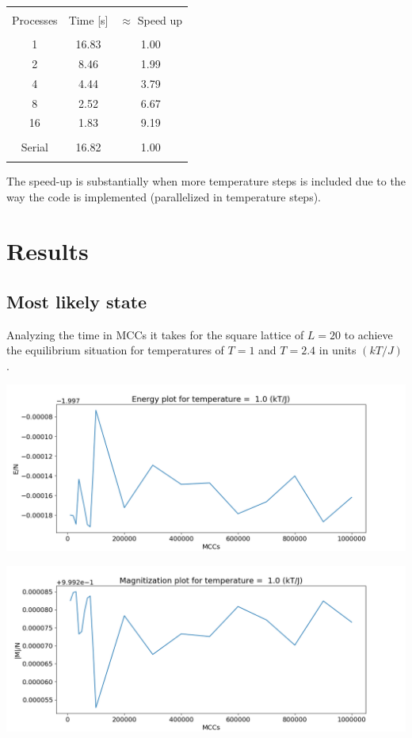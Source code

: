 \documentclass[a4paper, fontsize=11pt]{article}
\begin{document}
\begin{center}
\begin{tabular}{ccc}
\hline \\
Processes &Time [s] & $\approx$ Speed up \\
\hline \\
1 &16.83  &1.00\\
2 &8.46 &1.99 \\
4 &4.44 &3.79 \\
8 &2.52 &6.67 \\
16 &1.83 &9.19\\
\hline \\
Serial &16.82 & 1.00 \\
\hline \\
\end{tabular}
\end{center}

The speed-up is substantially when more temperature steps is included due to the way the code is implemented (parallelized in temperature steps).

\section{Results}
\subsection{Most likely state}
Analyzing the time in MCCs it takes for the square lattice of $L = 20$ to achieve the equilibrium situation for temperatures of $T = 1$ and $T = 2.4$ in units $(kT/J)$.

\begin{center}
\includegraphics[scale=0.45]{ET1.png} 
\end{center}

\begin{center}
\includegraphics[scale=0.45]{MT1.png} 
\end{center}
\end{document}
